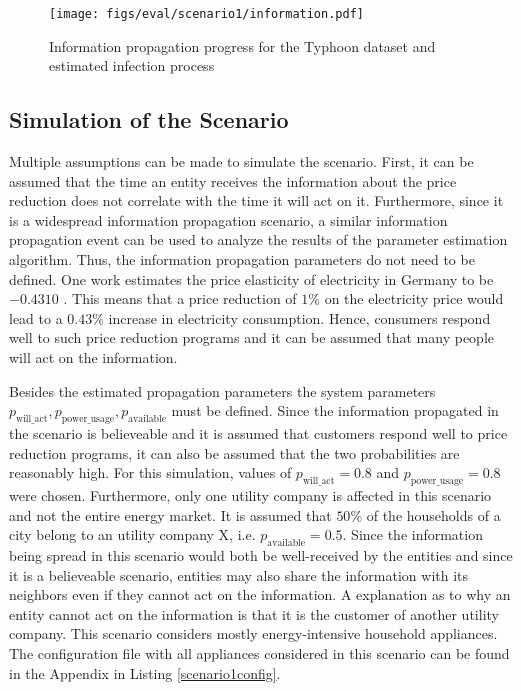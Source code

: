 \begin{figure}[!ht]
    \center
    \texttt{[image: figs/eval/scenario1/information.pdf]}
    \caption{Information propagation progress for the Typhoon dataset 
    and estimated infection process}
    \label{propagationestimationtyphoon}
\end{figure}

\subsection{Simulation of the Scenario}

Multiple assumptions can be made to simulate the scenario.
First, it can be assumed that the time an entity receives the information
about the price reduction does not correlate with the time it will act on
it. Furthermore, since it is a widespread information propagation scenario,
a similar information propagation event can be used to analyze the 
results of the parameter estimation algorithm. Thus, the information propagation
parameters do not need to be defined. One work estimates 
the price elasticity of electricity in Germany to be $-0.4310$
\cite{priceelasticity}. 
This means that a price reduction of $1\%$
on the electricity price would lead to a $0.43\%$ increase in
electricity consumption. Hence, consumers 
respond well to such price reduction programs and it 
can be assumed that many people will act on the information.

Besides the estimated propagation parameters
the system parameters $p_{\mathrm{will\_act}}, p_{\mathrm{power\_usage}},
p_{\mathrm{available}}$ must be defined. Since the information 
propagated in the scenario
is believeable and it is assumed that customers respond well to price 
reduction programs, it can also be assumed that the two probabilities are 
reasonably high. For this simulation, values of $p_{\mathrm{will\_act}}=0.8$ and 
$p_{\mathrm{power\_usage}}=0.8$ were chosen. Furthermore, 
only one utility company is affected in this scenario and not the entire 
energy market. It is assumed that $50\%$ of the households of a city belong
to an utility company X, i.e. $p_{\mathrm{available}}=0.5$.
Since the information being spread in this scenario would both be 
well-received by the entities and since it is a believeable scenario, 
entities may also share the information with its neighbors even if they
cannot act on the information. A explanation as to why an entity cannot act 
on the information is that it is the customer of another utility company.
This scenario considers mostly energy-intensive household appliances.
The configuration file with all appliances considered in this
scenario can be found in the Appendix in Listing \ref{scenario1config}.

